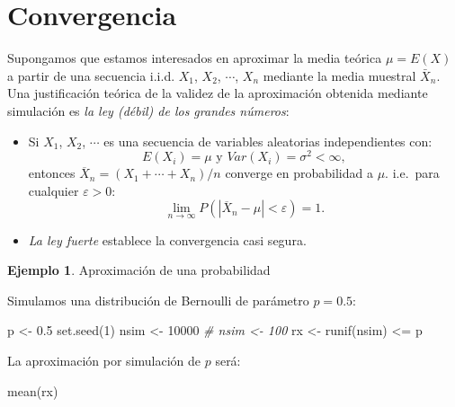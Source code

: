 \documentclass[
]{book}
\newenvironment{Shaded}{\begin{snugshade}}{\end{snugshade}}
\newcommand{\CommentTok}[1]{\textcolor[rgb]{0.56,0.35,0.01}{\textit{#1}}}
\newcommand{\DecValTok}[1]{\textcolor[rgb]{0.00,0.00,0.81}{#1}}
\newcommand{\FloatTok}[1]{\textcolor[rgb]{0.00,0.00,0.81}{#1}}
\newcommand{\FunctionTok}[1]{\textcolor[rgb]{0.00,0.00,0.00}{#1}}
\newcommand{\NormalTok}[1]{#1}
\newcommand{\OtherTok}[1]{\textcolor[rgb]{0.56,0.35,0.01}{#1}}
\newcommand{\SpecialCharTok}[1]{\textcolor[rgb]{0.00,0.00,0.00}{#1}}
\theoremstyle{break}
\theoremstyle{definition}
\theoremstyle{definition}
\newtheorem{example}{Ejemplo}[chapter]
\theoremstyle{definition}
\theoremstyle{definition}
\theoremstyle{remark}
\begin{document}
\hypertarget{convergencia}{%
\section{Convergencia}\label{convergencia}}

Supongamos que estamos interesados en aproximar la media teórica
\(\mu = E\left( X\right)\) a partir de una secuencia i.i.d. \(X_{1}\),
\(X_{2}\), \(\cdots\), \(X_{n}\) mediante la media muestral \(\bar{X}_{n}\).
Una justificación teórica de la validez de la aproximación obtenida
mediante simulación es \emph{la ley (débil) de los grandes números}:

\begin{itemize}
\item
  Si \(X_{1}\), \(X_{2}\), \(\cdots\) es una secuencia de variables aleatorias
  independientes con:
  \[E\left( X_{i}\right) =\mu \text{ y }Var\left( X_{i}\right) 
  =\sigma^{2}<\infty,\]
  entonces \(\overline{X}_{n}=\left( X_{1}+\cdots +X_{n}\right) /n\)
  converge en probabilidad a \(\mu\). i.e.~para cualquier \(\varepsilon >0\):
  \[\lim\limits_{n\rightarrow \infty }P\left( \left\vert \overline{X}_{n}-\mu
  \right\vert <\varepsilon \right) = 1.\]
\item
  \emph{La ley fuerte} establece la convergencia casi segura.
\end{itemize}

\begin{example}
\protect\hypertarget{exm:unnamed-chunk-2}{}{\label{exm:unnamed-chunk-2} }Aproximación de una probabilidad
\end{example}
Simulamos una distribución de Bernoulli de parámetro \(p=0.5\):

\begin{Shaded}
\begin{Highlighting}[]
\NormalTok{p }\OtherTok{\textless{}{-}} \FloatTok{0.5}
\FunctionTok{set.seed}\NormalTok{(}\DecValTok{1}\NormalTok{)}
\NormalTok{nsim }\OtherTok{\textless{}{-}} \DecValTok{10000}
\CommentTok{\# nsim \textless{}{-} 100}
\NormalTok{rx }\OtherTok{\textless{}{-}} \FunctionTok{runif}\NormalTok{(nsim) }\SpecialCharTok{\textless{}=}\NormalTok{ p}
\end{Highlighting}
\end{Shaded}

La aproximación por simulación de \(p\) será:

\begin{Shaded}
\begin{Highlighting}[]
\FunctionTok{mean}\NormalTok{(rx) }
\end{Highlighting}
\end{Shaded}
\end{document}
